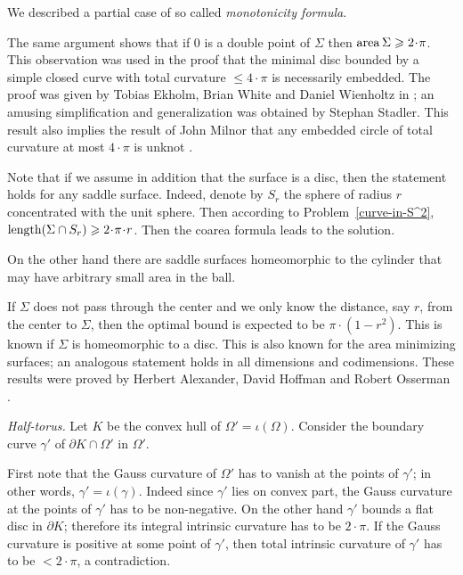 We described a partial case of so called \emph{monotonicity formula}.

The same argument shows that if $0$ is a double point
of $\Sigma$ then $\area\Sigma\ge 2\cdot \pi$.
This observation was used in the proof 
that the minimal disc bounded by a simple closed curve with total curvature $\le 4\cdot\pi$ 
is necessarily embedded.
The proof was given by 
Tobias Ekholm, 
Brian White
and Daniel Wienholtz
in \cite{EWW};
an amusing simplification and generalization
was obtained by 
Stephan Stadler. %
This result also implies the result of John Milnor that any embedded circle of total curvature at most $4\cdot\pi$ is unknot \cite[see][]{milnor}.

Note that if we assume in addition that the surface is a disc,
then the statement holds for any saddle surface. 
Indeed, denote by $S_r$ the sphere of radius $r$ concentrated with the unit sphere. 
Then according to Problem~\ref{curve-in-S^2}, 
$\length(\Sigma\cap S_r)\ge 2\cdot\pi\cdot r$.
Then the coarea formula leads to the solution.

On the other hand there are saddle surfaces homeomorphic to the cylinder
that may have arbitrary small area in the ball. 

If $\Sigma$ does not pass through the center 
and we only know the distance, say $r$, 
from the center to $\Sigma$,
then the optimal bound is expected to be $\pi\cdot(1-r^2)$.
This is known if $\Sigma$ is homeomorphic to a disc.
This is also known for the area minimizing surfaces;
an analogous statement
holds in all dimensions and codimensions.
These results were proved by 
Herbert Alexander, 
David Hoffman
and Robert Osserman \cite[see][]{alexander-osserman,alexander-hoffman-osserman}.






\textit{Half-torus.}
Let $K$ be the convex hull of $\Omega'=\iota(\Omega)$.
Consider the boundary curve $\gamma'$ of $\partial K\cap \Omega'$ in $\Omega'$.

First note that the Gauss curvature of $\Omega'$ has to vanish at the points of $\gamma'$;
in other words, $\gamma'=\iota(\gamma)$.
Indeed since $\gamma'$ lies on convex part, 
the Gauss curvature at the points of $\gamma'$ has to be non-negative. 
On the other hand $\gamma'$ bounds a flat disc in $\partial K$;
therefore its integral intrinsic curvature has to be $2{\cdot}\pi$.
If the Gauss curvature is positive at some point of $\gamma'$, 
then total intrinsic curvature of $\gamma'$ has to be $<2{\cdot}\pi$, a contradiction.

